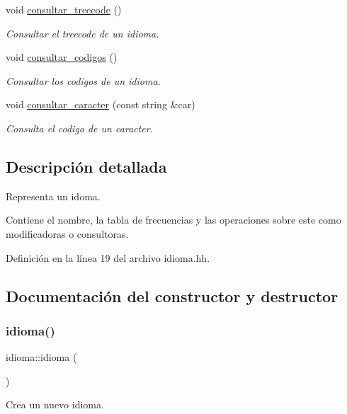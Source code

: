 \begin{DoxyCompactItemize}
void \hyperlink{classidioma_aba4621fa2985a6ceba574eeeca069b8d}{consultar\+\_\+treecode} ()
\begin{DoxyCompactList}\small\item\em Consultar el treecode de un idioma. \end{DoxyCompactList}\item 
void \hyperlink{classidioma_a4e58f4dbc3845d4d8cea0c6b923a2e4e}{consultar\+\_\+codigos} ()
\begin{DoxyCompactList}\small\item\em Consultar los codigos de un idioma. \end{DoxyCompactList}\item 
void \hyperlink{classidioma_ad7342a94567fbd464ef2ee40ad1bb213}{consultar\+\_\+caracter} (const string \&car)
\begin{DoxyCompactList}\small\item\em Consulta el codigo de un caracter. \end{DoxyCompactList}\end{DoxyCompactItemize}


\subsection{Descripción detallada}
Representa un idoma. 

Contiene el nombre, la tabla de frecuencias y las operaciones sobre este como modificadoras o consultoras. 

Definición en la línea 19 del archivo idioma.\+hh.



\subsection{Documentación del constructor y destructor}
\mbox{\label{classidioma_aef8714e17b1c5141104f5fb7bd989283}} 
\subsubsection{\texorpdfstring{idioma()}{idioma()}}
{\footnotesize\ttfamily idioma\+::idioma (\begin{DoxyParamCaption}{ }\end{DoxyParamCaption})}



Crea un nuevo idioma. 

